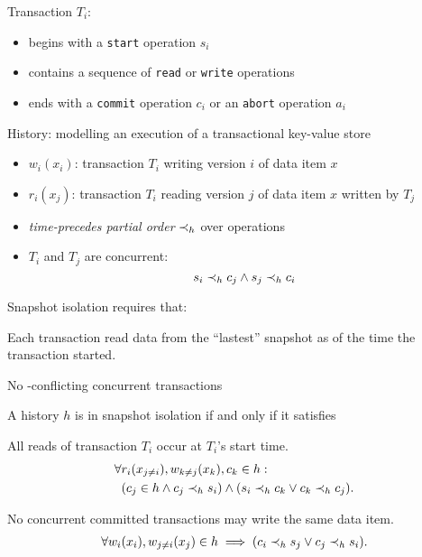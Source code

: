 \begin{frame}{}
    Transaction $T_i$:
    \begin{itemize}
      \item begins with a \texttt{start} operation $s_i$ 
      \item contains a sequence of \texttt{read} or \texttt{write} operations
      \item ends with a \texttt{commit} operation $c_i$ or an \texttt{abort} operation $a_i$
    \end{itemize}

    \pause
    \vspace{0.30cm}
    History: modelling an execution of a transactional key-value store
    \begin{itemize}
      \item $w_i(x_i)$: transaction $T_i$ writing version $i$ of data item $x$
      \item $r_i(x_j)$: transaction $T_i$ reading version $j$ of data item $x$ written by $T_j$
      \item \emph{time-precedes partial order} $\prec_{h}$ over operations
      \item $T_i$ and $T_j$ are concurrent:
	\[
	  s_i \prec_{h} c_j \land s_j \prec_{h} c_i
	\]
    \end{itemize}
\end{frame}

\begin{frame}{}
  Snapshot isolation requires that:
  \begin{description}
    \item[Snapshot Read:] Each transaction read data from the ``lastest'' snapshot as of the time the transaction started.
    \item[Snapshot Write:] No -conflicting concurrent transactions
  \end{description}
\end{frame}

\begin{frame}{}
  A history $h$ is in snapshot isolation if and only if it satisfies  \\[0.20cm]
  \begin{description}
    \item[Snapshot Read:] All reads of transaction $T_i$ occur at $T_i$'s start time.
      \begin{align*}
	\forall &r_i(x_{j \neq i}), w_{k \neq j}(x_k), c_k \in h: \\
	& (c_j \in h \land c_j \prec_{h} s_i)
	 \land (s_i \prec_{h} c_k \lor c_k \prec_{h} c_j).
      \end{align*}
    \item[Snapshot Write:] No concurrent committed transactions may write the same data item.
      \begin{align*}
	\forall w_i(x_i), w_{j \neq i}(x_j) \in h \implies (c_i \prec_{h} s_j \lor c_j \prec_{h} s_i).
      \end{align*}
  \end{description}
\end{frame}

